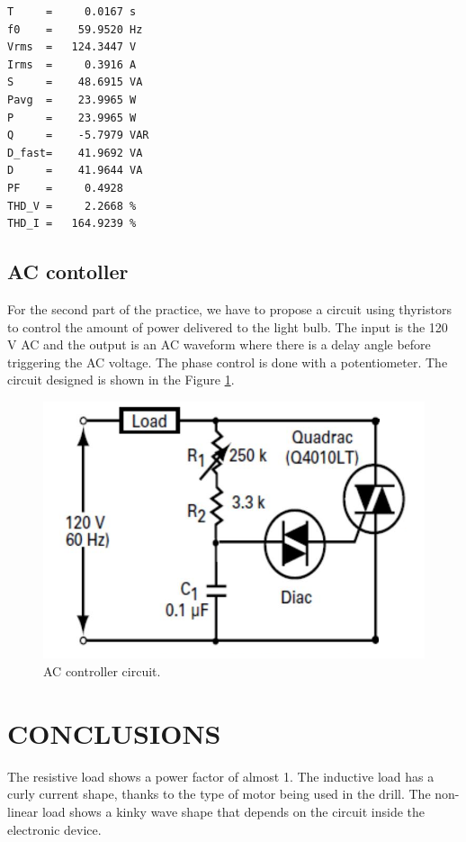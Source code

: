 \documentclass[journal]{IEEEtran}
\begin{document}
\begin{lstlisting}
T     =     0.0167 s 
f0    =    59.9520 Hz 
Vrms  =   124.3447 V
Irms  =     0.3916 A
S     =    48.6915 VA
Pavg  =    23.9965 W 
P     =    23.9965 W 
Q     =    -5.7979 VAR 
D_fast=    41.9692 VA 
D     =    41.9644 VA 
PF    =     0.4928 
THD_V =     2.2668 %
THD_I =   164.9239 %
\end{lstlisting}

\subsection{AC contoller}

For the second part of the practice, we have to propose a 
circuit using thyristors to control the amount of power 
delivered to the light bulb. The input is the 120 V AC and 
the output is an AC waveform where there is a delay angle 
before triggering the AC voltage. The phase control is 
done with a potentiometer. The circuit designed is shown 
in the Figure \ref{ACcontroller}.

\begin{figure}[h]
\centering
\includegraphics[clip,width=\columnwidth]{controller.png}
\caption{AC controller circuit.}
\label{ACcontroller}
\end{figure}

\section{CONCLUSIONS}

The resistive load shows a power factor of almost 1. The inductive 
load has a curly current shape, thanks to the type of motor being used 
in the drill. The non-linear load shows a kinky wave shape that 
depends on the circuit inside the electronic device.\\
\end{document}
